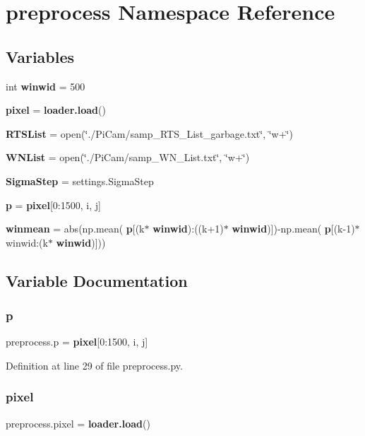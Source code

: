 \section{preprocess Namespace Reference}
\label{namespacepreprocess}
\subsection*{Variables}
\begin{DoxyCompactItemize}
\item 
int \textbf{ winwid} = 500
\item 
\textbf{ pixel} = \textbf{ loader.\+load}()
\item 
\textbf{ R\+T\+S\+List} = open(\char`\"{}./Pi\+Cam/samp\+\_\+\+R\+T\+S\+\_\+\+List\+\_\+garbage.\+txt\char`\"{}, \char`\"{}w+\char`\"{})
\item 
\textbf{ W\+N\+List} = open(\char`\"{}./Pi\+Cam/samp\+\_\+\+W\+N\+\_\+\+List.\+txt\char`\"{}, \char`\"{}w+\char`\"{})
\item 
\textbf{ Sigma\+Step} = settings.\+Sigma\+Step
\item 
\textbf{ p} = \textbf{ pixel}[0\+:1500, i, j]
\item 
\textbf{ winmean} = abs(np.\+mean(\textbf{ p}[(k$\ast$\textbf{ winwid})\+:((k+1)$\ast$\textbf{ winwid})])-\/np.\+mean(\textbf{ p}[(k-\/1)$\ast$winwid\+:(k$\ast$\textbf{ winwid})]))
\end{DoxyCompactItemize}


\subsection{Variable Documentation}
\mbox{\label{namespacepreprocess_ac334070d754ae1c24fca099e32871278}} 
\subsubsection{p}
{\footnotesize\ttfamily preprocess.\+p = \textbf{ pixel}[0\+:1500, i, j]}



Definition at line 29 of file preprocess.\+py.

\mbox{\label{namespacepreprocess_afd9c11219eead74ad166c95014cc7348}} 
\subsubsection{pixel}
{\footnotesize\ttfamily preprocess.\+pixel = \textbf{ loader.\+load}()}



